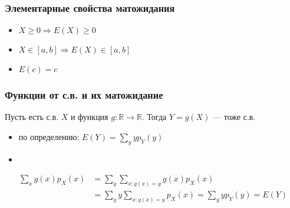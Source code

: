 \documentclass[hyperref=unicode,graphics=pdflatex,13pt,xcolor={usenames,dvipsnames}]{beamer}
\renewcommand\emph[1]{{\color{blue}{#1}}}
\newcommand\pitem{\pause\item}
\newcommand\R{\mathbb{R}}
\begin{document}
\begin{frame}
  \frametitle{Элементарные свойства матожидания}
  \begin{itemize}
    \item \emph{Неотрицательность:} $X \ge 0 \Rightarrow E(X) \ge 0$
    \item \emph{Ограниченность:} $X \in [a, b] \Rightarrow E(X) \in [a, b]$
    \item \emph{Матожидание константы:} $E(c) = c$
  \end{itemize}
\end{frame}

\begin{frame}
  \frametitle{Функции от с.в. и их матожидание}

  Пусть есть с.в. $X$ и функция $g: \R \to \R$. Тогда $Y = g(X)$ --- тоже с.в.

  \emph{Как посчитать $E(Y)$?}

  \begin{itemize}
    \pitem по определению: $E(Y) = \sum_y y p_Y(y)$
    \pitem 
  \end{itemize}
  
  \pause

  \begin{align*}
    \sum_x g(x)p_X(x) &= \sum_y \sum_{x: g(x) = y} g(x) p_X(x) \\
                      &= \sum_y y  \sum_{x: g(x) = y} p_X(x) = \sum_y y p_Y(y) = E(Y)
  \end{align*}


\end{frame}
\end{document}
